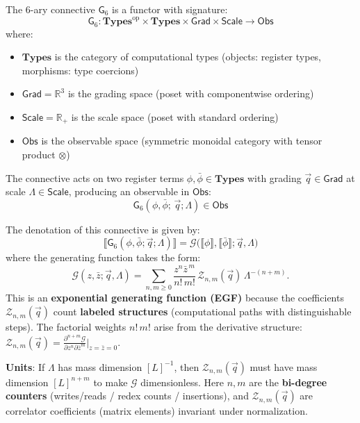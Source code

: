 \begin{definition}
\label{def:sixary-connective}
The 6-ary connective $\mathsf{G}_6$ is a functor with signature:
\[
\mathsf{G}_6 : \mathbf{Types}^{\mathrm{op}} \times \mathbf{Types} \times \mathsf{Grad} \times \mathsf{Scale} \to \mathsf{Obs}
\]
where:
\begin{itemize}
\item $\mathbf{Types}$ is the category of computational types (objects: register types, morphisms: type coercions)
\item $\mathsf{Grad} = \mathbb{R}^3$ is the grading space (poset with componentwise ordering)
\item $\mathsf{Scale} = \mathbb{R}_+$ is the scale space (poset with standard ordering)
\item $\mathsf{Obs}$ is the observable space (symmetric monoidal category with tensor product $\otimes$)
\end{itemize}
The connective acts on two register terms $\phi,\bar{\phi}\in\mathbf{Types}$ with grading $\vec{q}\in\mathsf{Grad}$ at scale $\Lambda\in\mathsf{Scale}$, producing an observable in $\mathsf{Obs}$:
\[
\mathsf{G}_6(\phi,\bar{\phi};\,\vec{q};\Lambda) \in \mathsf{Obs}
\]
\end{definition}
The denotation of this connective is given by:
\[
\llbracket \mathsf{G}_6(\phi,\bar{\phi};\vec{q};\Lambda)\rrbracket = \mathcal{G}\!\big(\llbracket\phi\rrbracket,\llbracket\bar{\phi}\rrbracket;\vec{q},\Lambda\big)
\]
where the generating function takes the form:
\begin{equation}
\mathcal{G}(z,\bar{z};\vec{q},\Lambda) = \sum_{n,m\ge0}\frac{z^n\bar{z}^{\,m}}{n!\,m!}\,\mathcal{Z}_{n,m}(\vec{q})\,\Lambda^{-(n+m)}.
\label{eq:generating-function}
\end{equation}
This is an \textbf{exponential generating function (EGF)} because the coefficients $\mathcal{Z}_{n,m}(\vec{q})$ count \textbf{labeled structures} (computational paths with distinguishable steps). The factorial weights $n!\,m!$ arise from the derivative structure: $\mathcal{Z}_{n,m}(\vec{q}) = \frac{\partial^{n+m}\mathcal{G}}{\partial z^n \partial \bar{z}^m}\big|_{z=\bar{z}=0}$.

\textbf{Units}: If $\Lambda$ has mass dimension $[L]^{-1}$, then $\mathcal{Z}_{n,m}(\vec{q})$ must have mass dimension $[L]^{n+m}$ to make $\mathcal{G}$ dimensionless. Here $n,m$ are the \textbf{bi-degree counters} (writes/reads / redex counts / insertions), and $\mathcal{Z}_{n,m}(\vec{q})$ are correlator coefficients (matrix elements) invariant under normalization.

